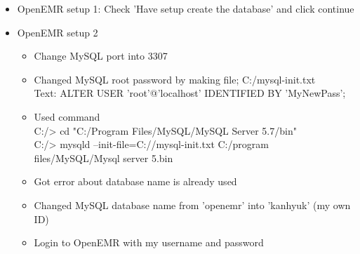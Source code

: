 \documentclass[paper=a4, fontsize=11pt]{scrartcl} %
\numberwithin{equation}{section} %
\numberwithin{figure}{section} %
\numberwithin{table}{section} %
\begin{document}
\begin{itemize}
\begin{itemize}
					{\tiny Notice: Undefined index: igroup in  C:/xampp/htdocs/openemr/library/classes/Installer.class.php on line 17}\\
					{\tiny Notice: Undefined index: server in  C:/xampp/htdocs/openemr/library/classes/Installer.class.php on line 18}\\
					{\tiny Notice: Undefined index: loginhost in  C:/xampp/htdocs/openemr/library/classes/Installer.class.php on line 19}
			\end{itemize}
			\begin{itemize}
				\item Changed values on php.ini file into \\
					{\tiny short open tag = Off }\\
					{\tiny max execution time = 60} \\
					{\tiny max input time = 90} \\
					{\tiny max input vars = 3000} \\
					{\tiny memory limit = 128M} \\
					{\tiny display errors = Off} \\
					{\tiny log errors = On} \\
					{\tiny register globals = Off} \\
					{\tiny post max size = 30M} \\
					{\tiny file uploads = On} \\
					{\tiny upload max filesize = 30M} \\
					{\tiny error reporting = E ALL E NOTICE E STRICT}
			\end{itemize}
	\item OpenEMR setup 1: Check 'Have setup create the database' and click continue
	\item OpenEMR setup 2 
			\begin{itemize}
					\item Change MySQL port into 3307
					\item Changed MySQL root password by making file; C:/mysql-init.txt\\
						Text: ALTER USER 'root'@'localhost' IDENTIFIED BY 'MyNewPass'; 
					\item Used command \\ 
						C:/> cd "C:/Program Files/MySQL/MySQL Server 5.7/bin"\\
						C:/> mysqld --init-file=C://mysql-init.txt C:/program files/MySQL/Mysql server 5.bin
					\item Got error about database name is already used
					\item Changed MySQL database name from 'openemr' into 'kanhyuk' (my own ID)
					\item Login to OpenEMR with my username and password
			\end{itemize}


\end{itemize}
\end{document}
